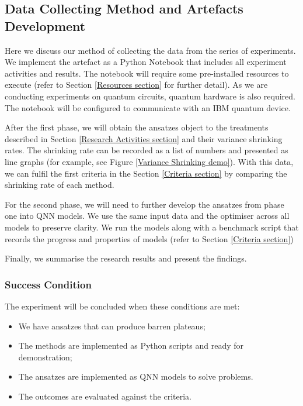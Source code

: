 \subsection{Data Collecting Method and Artefacts Development}
\label{Data Collecting Section}
Here we discuss our method of collecting the data from the series of experiments.
We implement the artefact as a Python Notebook that includes all experiment activities and results.
The notebook will require some pre-installed resources to execute (refer to Section \ref{Resources section} for further detail).
As we are conducting experiments on quantum circuits, quantum hardware is also required.
The notebook will be configured to communicate with an IBM quantum device.

After the first phase, we will obtain the ansatzes object to the treatments described in Section \ref{Research Activities section} and their variance shrinking rates.
The shrinking rate can be recorded as a list of numbers and presented as line graphs (for example, see Figure \ref{Variance Shrinking demo}).
With this data, we can fulfil the first criteria in the Section \ref{Criteria section} by comparing the shrinking rate of each method.

For the second phase, we will need to further develop the ansatzes from phase one into QNN models. We use the same input data and the optimiser across all models to preserve clarity.
We run the models along with a benchmark script that records the progress and properties of models (refer to Section \ref{Criteria section})

Finally, we summarise the research results and present the findings.

\subsubsection{Success Condition}
The experiment will be concluded when these conditions are met:
\begin{itemize}
    \item We have ansatzes that can produce barren plateaus;
    \item The methods are implemented as Python scripts and ready for demonstration;
    \item The ansatzes are implemented as QNN models to solve problems.
    \item The outcomes are evaluated against the criteria.
\end{itemize}